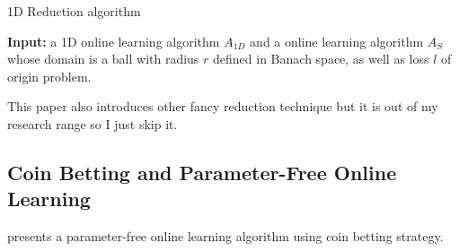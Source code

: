 \begin{algorithm}
\caption{1D Reduction algorithm}
\label{alg:1DReduction}
{\bfseries Input:} a 1D online learning algorithm $A_{1D}$ and a online learning algorithm $A_S$ whose domain is a ball with radius $r$ defined in Banach space, as well as loss $l$ of origin problem.
\begin{algorithmic}[1]
\EndFor
\end{algorithmic}
\end{algorithm}

This paper also introduces other fancy reduction technique but it is out of my research range so I just skip it.

\subsection{Coin Betting and Parameter-Free Online Learning}
\cite{Orabona2016} presents a parameter-free online learning algorithm using coin betting strategy. 

